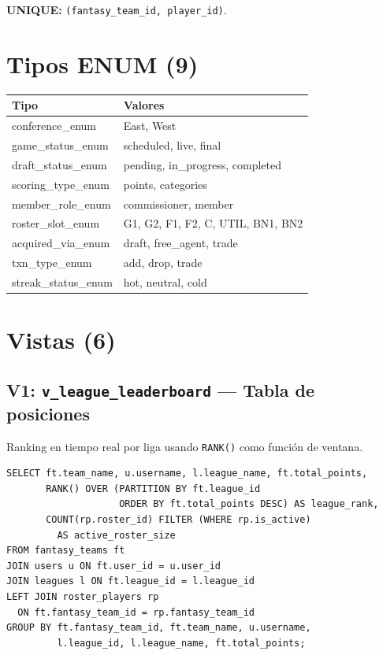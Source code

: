 \documentclass[12pt,a4paper]{article}
\begin{document}
\textbf{UNIQUE:} \texttt{(fantasy\_team\_id, player\_id)}.

\section{Tipos ENUM (9)}

\begin{longtable}{>{\ttfamily\small}p{4cm} p{9.5cm}}
\toprule
\normalfont\textbf{Tipo} & \textbf{Valores} \\
\midrule
\endhead
conference\_enum & East, West \\
game\_status\_enum & scheduled, live, final \\
draft\_status\_enum & pending, in\_progress, completed \\
scoring\_type\_enum & points, categories \\
member\_role\_enum & commissioner, member \\
roster\_slot\_enum & G1, G2, F1, F2, C, UTIL, BN1, BN2 \\
acquired\_via\_enum & draft, free\_agent, trade \\
txn\_type\_enum & add, drop, trade \\
streak\_status\_enum & hot, neutral, cold \\
\bottomrule
\end{longtable}

\section{Vistas (6)}

\subsection{V1: \texttt{v\_league\_leaderboard} --- Tabla de posiciones}

Ranking en tiempo real por liga usando \texttt{RANK()} como funci\'on de ventana.

\begin{lstlisting}
SELECT ft.team_name, u.username, l.league_name, ft.total_points,
       RANK() OVER (PARTITION BY ft.league_id
                    ORDER BY ft.total_points DESC) AS league_rank,
       COUNT(rp.roster_id) FILTER (WHERE rp.is_active)
         AS active_roster_size
FROM fantasy_teams ft
JOIN users u ON ft.user_id = u.user_id
JOIN leagues l ON ft.league_id = l.league_id
LEFT JOIN roster_players rp
  ON ft.fantasy_team_id = rp.fantasy_team_id
GROUP BY ft.fantasy_team_id, ft.team_name, u.username,
         l.league_id, l.league_name, ft.total_points;
\end{lstlisting}
\end{document}
